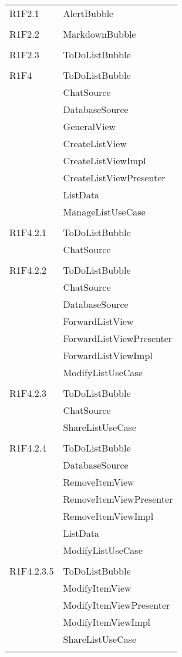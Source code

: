 \begin{center}
\begin{longtable}{|p{7cm}|p{5cm}|}
		R1F2.1 & AlertBubble \\ & \\ \hline
		R1F2.2 & MarkdownBubble \\ & \\ \hline
		R1F2.3 & ToDoListBubble \\ & \\ \hline
		R1F4 & ToDoListBubble \\ & ChatSource \\ & DatabaseSource \\ & GeneralView \\ & CreateListView \\ & CreateListViewImpl \\ & CreateListViewPresenter \\ & ListData \\ & ManageListUseCase \\ & \\ \hline
		R1F4.2.1 & ToDoListBubble \\ & ChatSource \\ & \\ \hline
		R1F4.2.2 & ToDoListBubble \\ & ChatSource \\ & DatabaseSource \\ & ForwardListView \\ & ForwardListViewPresenter \\ & ForwardListViewImpl \\ & ModifyListUseCase \\ & \\ \hline
		R1F4.2.3 & ToDoListBubble \\ & ChatSource \\ & ShareListUseCase \\ & \\ \hline
		R1F4.2.4 & ToDoListBubble \\ & DatabaseSource \\ & RemoveItemView \\ & RemoveItemViewPresenter \\ & RemoveItemViewImpl \\ & ListData \\ & ModifyListUseCase \\ & \\ \hline
		R1F4.2.3.5 & ToDoListBubble \\ & ModifyItemView \\ & ModifyItemViewPresenter \\ & ModifyItemViewImpl \\ & ShareListUseCase \\ & \\ \hline

\end{longtable}
\end{center}
